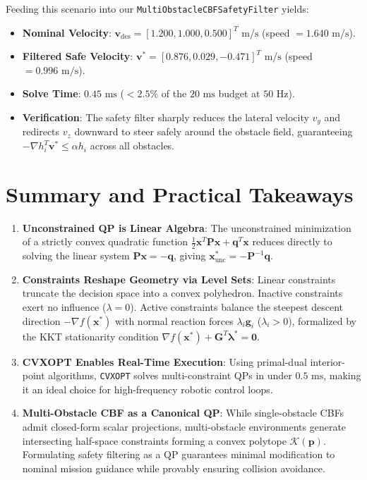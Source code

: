 \documentclass[11pt,a4paper]{article}
\begin{document}
Feeding this scenario into our \texttt{MultiObstacleCBFSafetyFilter} yields:
\begin{itemize}
    \item \textbf{Nominal Velocity}: $\mathbf{v}_{\mathrm{des}} = [1.200, 1.000, 0.500]^T\text{ m/s}$ (speed $= 1.640\text{ m/s}$).
    \item \textbf{Filtered Safe Velocity}: $\mathbf{v}^* = [0.876, 0.029, -0.471]^T\text{ m/s}$ (speed $= 0.996\text{ m/s}$).
    \item \textbf{Solve Time}: $0.45\text{ ms}$ ($< 2.5\%$ of the $20\text{ ms}$ budget at $50\text{ Hz}$).
    \item \textbf{Verification}: The safety filter sharply reduces the lateral velocity $v_y$ and redirects $v_z$ downward to steer safely around the obstacle field, guaranteeing $-\nabla h_i^T \mathbf{v}^* \le \alpha h_i$ across all obstacles.
\end{itemize}

\section{Summary and Practical Takeaways}

\begin{enumerate}
    \item \textbf{Unconstrained QP is Linear Algebra}:
    The unconstrained minimization of a strictly convex quadratic function $\frac{1}{2}\mathbf{x}^T\mathbf{P}\mathbf{x} + \mathbf{q}^T\mathbf{x}$ reduces directly to solving the linear system $\mathbf{P}\mathbf{x} = -\mathbf{q}$, giving $\mathbf{x}^*_{\mathrm{unc}} = -\mathbf{P}^{-1}\mathbf{q}$.
    
    \item \textbf{Constraints Reshape Geometry via Level Sets}:
    Linear constraints truncate the decision space into a convex polyhedron. Inactive constraints exert no influence ($\lambda = 0$). Active constraints balance the steepest descent direction $-\nabla f(\mathbf{x}^*)$ with normal reaction forces $\lambda_i \mathbf{g}_i$ ($\lambda_i > 0$), formalized by the KKT stationarity condition $\nabla f(\mathbf{x}^*) + \mathbf{G}^T \bm{\lambda}^* = \mathbf{0}$.
    
    \item \textbf{CVXOPT Enables Real-Time Execution}:
    Using primal-dual interior-point algorithms, \texttt{CVXOPT} solves multi-constraint QPs in under $0.5\text{ ms}$, making it an ideal choice for high-frequency robotic control loops.
    
    \item \textbf{Multi-Obstacle CBF as a Canonical QP}:
    While single-obstacle CBFs admit closed-form scalar projections, multi-obstacle environments generate intersecting half-space constraints forming a convex polytope $\mathcal{K}(\mathbf{p})$. Formulating safety filtering as a QP guarantees minimal modification to nominal mission guidance while provably ensuring collision avoidance.
\end{enumerate}
\end{document}
